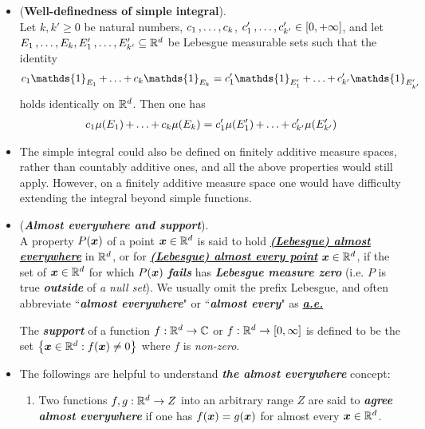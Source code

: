 \documentclass[11pt]{article}
\begin{document}
\begin{itemize}
\item \begin{lemma} (\textbf{Well-definedness of simple integral}).\citep{tao2011introduction} \\
Let $k, k' \ge 0$ be natural numbers, $c_1 \,{,}\ldots{,}\, c_k$, $c_1' \,{,}\ldots{,}\, c_{k'}' \in [0, +\infty]$, and let $E_1 \,{,}\ldots{,}\, E_k, E_1' \,{,}\ldots{,}\, E_{k'}' \subseteq  {\mathbb R}^d$ be Lebesgue measurable sets such that the identity
\begin{align*}
c_1\mathds{1}_{E_1} \xdotx{+} c_k\mathds{1}_{E_k} = c_1'\mathds{1}_{E_1'} \xdotx{+} c_{k'}'\mathds{1}_{E_{k'}'}
\end{align*} holds identically on ${\mathbb R}^d$. Then one has
\begin{align*}
c_1\mu(E_1) \,{+}\ldots{+}\, c_k\mu(E_k) = c_1'\mu(E_1') \,{+}\ldots{+}\, c_{k'}'\mu(E_{k'}')
\end{align*}
\end{lemma}


\item \begin{remark} 
The simple integral could also be defined on finitely additive measure spaces, rather than countably additive ones, and all the above properties would still apply. However, on a finitely additive measure space one would have difficulty extending the integral beyond simple functions.
\end{remark}


\item \begin{definition} (\emph{\textbf{Almost everywhere and support}}).\\
 A property $P(\boldsymbol{x})$ of a point $\boldsymbol{x} \in {\mathbb R}^d$ is said to hold \underline{\emph{\textbf{(Lebesgue) almost everywhere}}} in ${\mathbb R}^d$, or for \underline{\emph{\textbf{(Lebesgue) almost every point}}} $\boldsymbol{x} \in  {\mathbb R}^d$, if the set of $\boldsymbol{x} \in  {\mathbb R}^d$ for which $P(\boldsymbol{x})$ \emph{\textbf{fails}} has  \emph{\textbf{Lebesgue measure zero}} (i.e. $P$ is true \emph{\textbf{outside}} of \emph{a null set}). We usually omit the prefix Lebesgue, and often abbreviate ``\emph{\textbf{almost everywhere}}" or ``\emph{\textbf{almost every}}" as \underline{\emph{\textbf{a.e.}}}
 
 The \emph{\textbf{support}} of a function $f: {\mathbb R}^d \rightarrow {\mathbb C}$ or $f : {\mathbb R}^d \rightarrow  [0, \infty]$ is defined to be the set $\left\{\boldsymbol{x}\in {\mathbb R}^d: f(\boldsymbol{x}) \neq 0\right\}$ where $f$ is \emph{non-zero}.
\end{definition}

\item \begin{remark}
The followings are helpful to understand \emph{\textbf{the almost everywhere}} concept:
\begin{enumerate}
\item Two functions $f, g : {\mathbb R}^d \rightarrow Z$ into an arbitrary range $Z$ are said to \emph{\textbf{agree almost everywhere}} if one has $f(\boldsymbol{x}) = g(\boldsymbol{x})$ for almost every $\boldsymbol{x} \in {\mathbb R}^d$.


\end{enumerate}
\end{remark}
\end{itemize}
\end{document}
